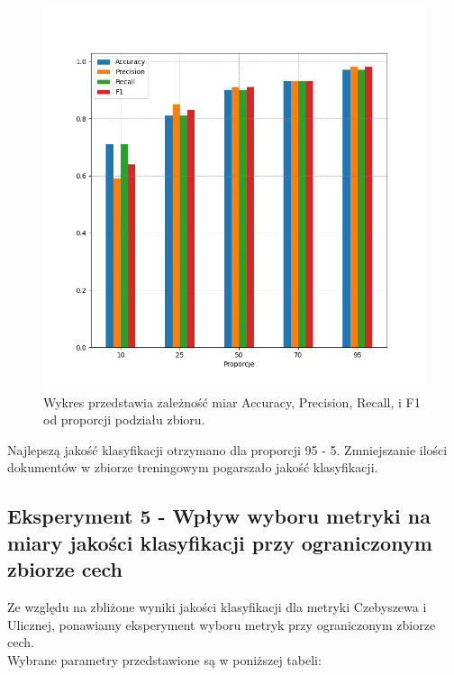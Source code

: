 \documentclass{classrep}
\begin{document}
\begin{figure}[h!]
 \centering
 \includegraphics[width=15cm]{wykres_proporcje.png}
 \vspace{-0.3cm}
 \caption{Wykres przedstawia zależność miar Accuracy, Precision, Recall, i F1 od proporcji podziału zbioru.}
 \label{wykres4}
\end{figure}

\newpage


Najlepszą jakość klasyfikacji otrzymano dla proporcji 95 - 5. Zmniejszanie ilości dokumentów w zbiorze treningowym pogarszało jakość klasyfikacji.\\

\newpage

\subsection{Eksperyment 5 - Wpływ wyboru metryki na miary jakości klasyfikacji przy ograniczonym zbiorze cech}
\label{subsection:ex5}
Ze względu na zbliżone wyniki jakości klasyfikacji dla metryki Czebyszewa i Ulicznej, ponawiamy eksperyment wyboru metryk przy ograniczonym zbiorze cech. \\

Wybrane parametry przedstawione są w poniższej tabeli:
 
\end{document}
